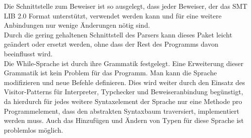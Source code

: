 Die Schnittstelle zum Beweiser ist so ausgelegt, dass jeder Beweiser, der das SMT LIB 2.0 Format unterst\"{u}tzt, verwendet werden kann und f\"{u}r eine weitere Anbindungen nur wenige \"{A}nderungen n\"{o}tig sind.\\
Durch die gering gehaltenen Schnittstell des Parsers kann dieses Paket leicht ge\"{a}ndert oder ersetzt werden, ohne dass der Rest des Programms davon beeinflusst wird.\\
Die While-Sprache ist durch ihre Grammatik festgelegt. Eine Erweiterung dieser Grammatik ist kein Problem f\"{u}r das Programm. Man kann die Sprache modifizieren und neue Befehle definieren. Dies wird weiter durch den Einsatz des Visitor-Patterns f\"{u}r Interpreter, Typchecker und Beweiseranbindung beg\"{u}nstigt, da hierdurch f\"{u}r jedes weitere Syntaxelement der Sprache nur eine Methode pro Programmelement, dass den abstrakten Syntaxbaum traversiert, implementiert werden muss. Auch das Hinzuf\"{u}gen und \"{A}ndern von Typen f\"{u}r diese Sprache ist problemlos m\"{o}glich.
